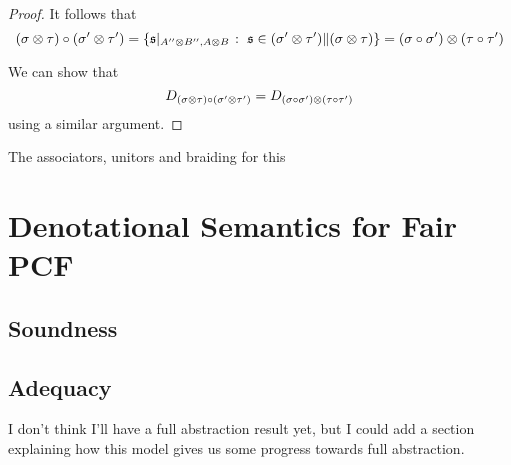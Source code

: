 \documentclass{article}
\begin{document}
\begin{proposition}
\begin{proof}
    It follows that
    \[
      (\sigma\otimes\tau) \circ (\sigma'\otimes\tau')
      = \left\{\mathfrak s\vert_{A''\otimes B'', A\otimes B}\;\colon\;\mathfrak s\in(\sigma'\otimes\tau')\|(\sigma\otimes\tau)\right\}
      = (\sigma \circ \sigma')\otimes(\tau \circ \tau')
      \]

    We can show that
    \[
      D_{(\sigma\otimes\tau) \circ (\sigma'\otimes\tau')} = D_{(\sigma \circ \sigma')\otimes(\tau \circ \tau')}
      \]
    using a similar argument.
  \end{proof}
\end{proposition}

The associators, unitors and braiding for this 

\section{Denotational Semantics for Fair PCF}

\subsection{Soundness}

\subsection{Adequacy}

I don't think I'll have a full abstraction result yet, but I could add a section explaining how this model gives us some progress towards full abstraction.  



\end{document}
